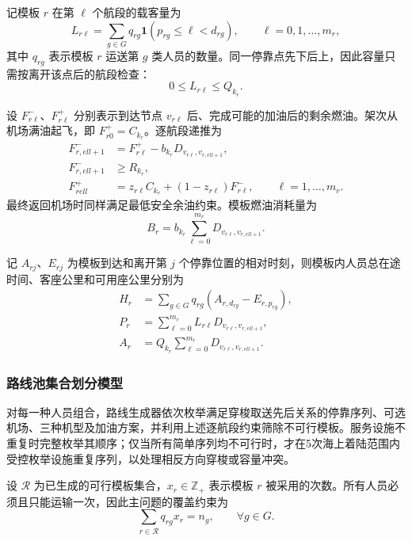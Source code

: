 \documentclass[UTF-8,a4paper,zihao=-4]{ctexart}
\begin{document}
记模板 $r$ 在第 $\ell$ 个航段的载客量为
\begin{equation}
 L_{r\ell}=\sum_{g\in G}q_{rg}
 \mathbf 1\!\left(p_{rg}\leq \ell<d_{rg}\right),
 \qquad \ell=0,1,\ldots,m_r,
\end{equation}
其中 $q_{rg}$ 表示模板 $r$ 运送第 $g$ 类人员的数量。同一停靠点先下后上，因此容量只需按离开该点后的航段检查：
\begin{equation}
 0\leq L_{r\ell}\leq Q_{k_r}.
\end{equation}

设 $F_{r\ell}^{-}$、$F_{r\ell}^{+}$ 分别表示到达节点 $v_{r\ell}$ 后、完成可能的加油后的剩余燃油。架次从机场满油起飞，即 $F_{r0}^{+}=C_{k_r}$。逐航段递推为
\begin{align}
 F_{r,ell+1}^{-}
 &=F_{r\ell}^{+}-b_{k_r}D_{v_{r\ell},v_{r,ell+1}},\\
 F_{r,ell+1}^{-}&\geq R_{k_r},\\
 F_{rell}^{+}
 &=z_{r\ell}C_{k_r}+(1-z_{r\ell})F_{r\ell}^{-},
 \qquad \ell=1,\ldots,m_r.
\end{align}
最终返回机场时同样满足最低安全余油约束。模板燃油消耗量为
\begin{equation}
 B_r=b_{k_r}\sum_{\ell=0}^{m_r}D_{v_{r\ell},v_{r,ell+1}}.
\end{equation}

记 $A_{rj}$、$E_{rj}$ 为模板到达和离开第 $j$ 个停靠位置的相对时刻，则模板内人员总在途时间、客座公里和可用座公里分别为
\begin{align}
 H_r&=\sum_{g\in G}q_{rg}\left(A_{r,d_{rg}}-E_{r,p_{rg}}\right),\\
 P_r&=\sum_{\ell=0}^{m_r}L_{r\ell}D_{v_{r\ell},v_{r,ell+1}},\\
 A_r&=Q_{k_r}\sum_{\ell=0}^{m_r}D_{v_{r\ell},v_{r,ell+1}}.
\end{align}

\subsubsection{路线池集合划分模型}

对每一种人员组合，路线生成器依次枚举满足穿梭取送先后关系的停靠序列、可选机场、三种机型及加油方案，并利用上述逐航段约束筛除不可行模板。服务设施不重复时完整枚举其顺序；仅当所有简单序列均不可行时，才在5次海上着陆范围内受控枚举设施重复序列，以处理相反方向穿梭或容量冲突。

设 $\mathcal R$ 为已生成的可行模板集合，$x_r\in\mathbb Z_{+}$ 表示模板 $r$ 被采用的次数。所有人员必须且只能运输一次，因此主问题的覆盖约束为
\begin{equation}
 \sum_{r\in\mathcal R}q_{rg}x_r=n_g,
 \qquad \forall g\in G.
\end{equation}
\end{document}
